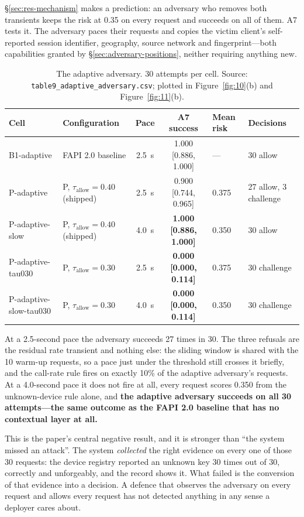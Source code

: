 \S\ref{sec:res-mechanism} makes a prediction: an adversary who removes both transients keeps the risk at 0.35 on every request and succeeds on all of them. A7 tests it. The adversary paces their requests and copies the victim client's self-reported session identifier, geography, source network and fingerprint---both capabilities granted by \S\ref{sec:adversary-positions}, neither requiring anything new.

\setcounter{table}{2}
\begin{table}[t]
\centering
\caption{The adaptive adversary. 30 attempts per cell. Source: \texttt{table9\_adaptive\_adversary.csv}; plotted in Figure~\ref{fig:10}(b) and Figure~\ref{fig:11}(b).}
\label{tab:3}
\small
\begin{tabular}{lp{2.9cm}ccll}
\toprule
Cell & Configuration & Pace & A7 success & Mean risk & Decisions \\
\midrule
B1-adaptive & FAPI 2.0 baseline & 2.5~s & 1.000 [0.886, 1.000] & --- & 30 allow \\
P-adaptive & P, $\tau_{\mathrm{allow}} = 0.40$ (shipped) & 2.5~s & 0.900 [0.744, 0.965] & 0.375 & 27 allow, 3 challenge \\
P-adaptive-slow & P, $\tau_{\mathrm{allow}} = 0.40$ (shipped) & 4.0~s & \textbf{1.000 [0.886, 1.000]} & 0.350 & 30 allow \\
P-adaptive-tau030 & P, $\tau_{\mathrm{allow}} = 0.30$ & 2.5~s & \textbf{0.000 [0.000, 0.114]} & 0.375 & 30 challenge \\
P-adaptive-slow-tau030 & P, $\tau_{\mathrm{allow}} = 0.30$ & 4.0~s & \textbf{0.000 [0.000, 0.114]} & 0.350 & 30 challenge \\
\bottomrule
\end{tabular}
\end{table}

At a 2.5-second pace the adversary succeeds 27 times in 30. The three refusals are the residual rate transient and nothing else: the sliding window is shared with the 10 warm-up requests, so a pace just under the threshold still crosses it briefly, and the call-rate rule fires on exactly 10\% of the adaptive adversary's requests. At a 4.0-second pace it does not fire at all, every request scores 0.350 from the unknown-device rule alone, and \textbf{the adaptive adversary succeeds on all 30 attempts---the same outcome as the FAPI 2.0 baseline that has no contextual layer at all.}

This is the paper's central negative result, and it is stronger than ``the system missed an attack''. The system \textit{collected} the right evidence on every one of those 30 requests: the device registry reported an unknown key 30 times out of 30, correctly and unforgeably, and the record shows it. What failed is the conversion of that evidence into a decision. A defence that observes the adversary on every request and allows every request has not detected anything in any sense a deployer cares about.

